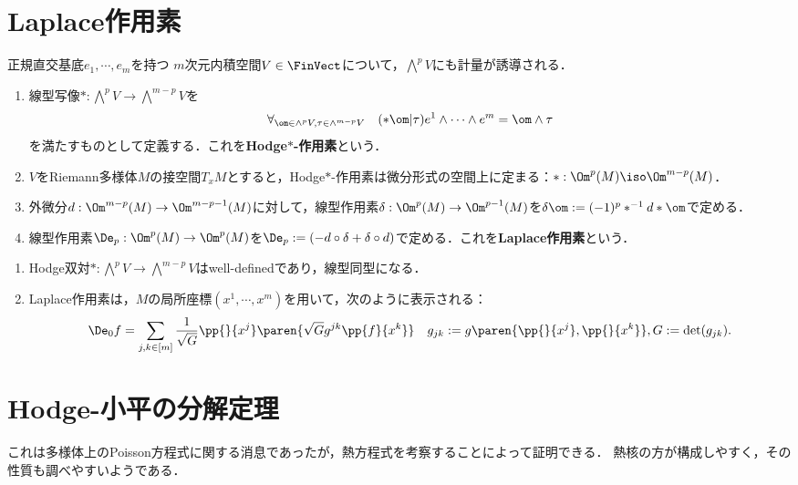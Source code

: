 \documentclass[uplatex,dvipdfmx]{jsreport}
\begin{document}
\section{Laplace作用素}

\begin{definition}
    正規直交基底$e_1,\cdots,e_m$を持つ
    $m$次元内積空間$V\in\FinVect$について，$\bigwedge^pV$にも計量が誘導される．
    \begin{enumerate}
        \item 線型写像$*:\bigwedge^pV\to\bigwedge^{m-p}V$を
        \[\forall_{\om\in\wedge^pV,\tau\in\wedge^{m-p}V}\quad (*\om|\tau)e^1\wedge\cdots\wedge e^m=\om\wedge\tau\]
        を満たすものとして定義する．これを\textbf{Hodge$*$-作用素}という．
        \item $V$をRiemann多様体$M$の接空間$T_xM$とすると，Hodge$*$-作用素は微分形式の空間上に定まる：$*:\Om^p(M)\iso \Om^{m-p}(M)$．
        \item 外微分$d:\Om^{m-p}(M)\to \Om^{m-p-1}(M)$に対して，線型作用素$\delta:\Om^p(M)\to \Om^{p-1}(M)$を$\delta\om:=(-1)^p*^{-1}d*\om$で定める．
        \item 線型作用素$\De_p:\Om^p(M)\to\Om^p(M)$を$\De_p:=(-d\circ\delta+\delta\circ d)$で定める．これを\textbf{Laplace作用素}という．
    \end{enumerate}
\end{definition}

\begin{lemma}\mbox{}
    \begin{enumerate}
        \item Hodge双対$*:\bigwedge^pV\to\bigwedge^{m-p}V$はwell-definedであり，線型同型になる．
        \item Laplace作用素は，$M$の局所座標$(x^1,\cdots,x^m)$を用いて，次のように表示される：
        \[\De_0 f=\sum_{j,k\in[m]}\frac{1}{\sqrt{G}}\pp{}{x^j}\paren{\sqrt{G}g^{jk}\pp{f}{x^k}}\quad g_{jk}:=g\paren{\pp{}{x^j},\pp{}{x^k}},G:=\det(g_{jk}).\]
    \end{enumerate}
\end{lemma}

\section{Hodge-小平の分解定理}

\begin{tcolorbox}[colframe=ForestGreen, colback=ForestGreen!10!white,breakable,colbacktitle=ForestGreen!40!white,coltitle=black,fonttitle=\bfseries\sffamily,
title=]
    これは多様体上のPoisson方程式に関する消息であったが，熱方程式を考察することによって証明できる．
    熱核の方が構成しやすく，その性質も調べやすいようである．
\end{tcolorbox}
\end{document}
